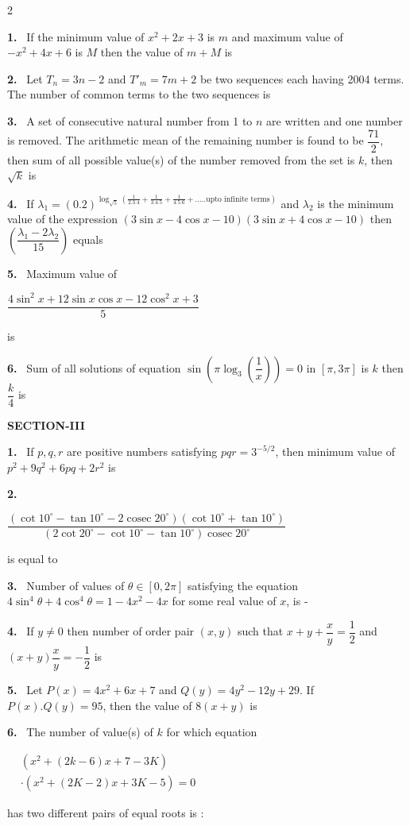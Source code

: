 \documentclass[10pt]{extarticle}
\newcommand{\sect}[1]{\par\smallskip\noindent\textbf{#1}\par}
\newcommand{\qn}[1]{\par\smallskip\noindent\textbf{#1.}~}
\begin{document}
\begin{multicols}{2}
\qn{1} If the minimum value of $x^2+2x+3$ is $m$ and maximum value of $-x^2+4x+6$ is $M$ then the value of $m+M$ is
\qn{2} Let $T_n=3n-2$ and $T'_m=7m+2$ be two sequences each having 2004 terms. The number of common terms to the two sequences is
\qn{3} A set of consecutive natural number from 1 to $n$ are written and one number is removed. The arithmetic mean of the remaining number is found to be $\dfrac{71}2$, then sum of all possible value(s) of the number removed from the set is $k$, then $\sqrt k$ is
\qn{4} If $\lambda_1=(0.2)^{\log_{\sqrt5}\left(\frac1{2.3.4}+\frac1{3.4.5}+\frac1{4.5.6}+\ldots..\text{upto infinite terms}\right)}$ and $\lambda_2$ is the minimum value of the expression $(3\sin x-4\cos x-10)(3\sin x+4\cos x-10)$ then $\left(\dfrac{\lambda_1-2\lambda_2}{15}\right)$ equals
\qn{5} Maximum value of
\par\noindent\hfill$\dfrac{4\sin^2x+12\sin x\cos x-12\cos^2x+3}5$\hfill\null\par
is
\qn{6} Sum of all solutions of equation $\sin\left(\pi\log_3\left(\dfrac1x\right)\right)=0$ in $[\pi,3\pi]$ is $k$ then $\dfrac k4$ is
\sect{SECTION-III}
\qn{1} If $p,q,r$ are positive numbers satisfying $pqr=3^{-5/2}$, then minimum value of $p^2+9q^2+6pq+2r^2$ is
\qn{2} \par\noindent\hfill$\dfrac{\left(\cot10^\circ-\tan10^\circ-2\operatorname{cosec}20^\circ\right)\left(\cot10^\circ+\tan10^\circ\right)}{\left(2\cot20^\circ-\cot10^\circ-\tan10^\circ\right)\operatorname{cosec}20^\circ}$\hfill\null\par
is equal to
\qn{3} Number of values of $\theta\in[0,2\pi]$ satisfying the equation $4\sin^4\theta+4\cos^4\theta=1-4x^2-4x$ for some real value of $x$, is -
\qn{4} If $y\ne0$ then number of order pair $(x,y)$ such that $x+y+\dfrac xy=\dfrac12$ and $(x+y)\dfrac xy=-\dfrac12$ is
\qn{5} Let $P(x)=4x^2+6x+7$ and $Q(y)=4y^2-12y+29$. If $P(x).Q(y)=95$, then the value of $8(x+y)$ is
\qn{6} The number of value(s) of $k$ for which equation
\par\noindent\hfill$\begin{aligned}&\left(x^2+(2k-6)x+7-3K\right)\\&\cdot\left(x^2+(2K-2)x+3K-5\right)=0\end{aligned}$\hfill\null\par
has two different pairs of equal roots is :
\end{multicols}
\end{document}
